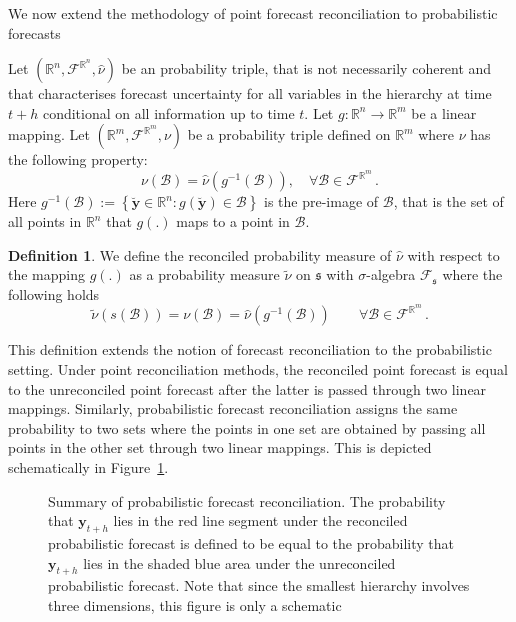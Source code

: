 \documentclass[a4paper, 11pt]{article}
\theoremstyle{theo}
\theoremstyle{definition}
\newtheorem{definition}{Definition}[section]
\begin{document}
We now extend the methodology of point forecast reconciliation to probabilistic forecasts


  Let $(\mathbb{R}^n, \mathscr{F}^{\mathbb{R}^n}, \hat{\nu})$ be an probability triple, that is not necessarily coherent and that characterises forecast uncertainty for all variables in the hierarchy at time $t+h$ conditional on all information up to time $t$.  Let $g:\mathbb{R}^n \rightarrow \mathbb{R}^m $ be a linear mapping.  Let $(\mathbb{R}^m, \mathscr{F}^{\mathbb{R}^m}, \nu)$ be a probability triple defined on $\mathbb{R}^m$ where $\nu$ has the following property:
  \begin{equation}
  \nu(\mathcal{B}) = \hat{\nu}(g^{-1}(\mathcal{B})), \quad \forall \mathcal{B} \in \mathscr{F}^{\mathbb{R}^m}\,.
  \end{equation}
  Here $g^{-1}(\mathcal{B}):=\left\{\breve{\bm{y}}\in \mathbb{R}^n:g(\breve{\bm{y}})\in \mathcal{B} \right\}$ is the pre-image of $\mathcal{B}$, that is the set of all points in $\mathbb{R}^n$ that $g(.)$ maps to a point in $\mathcal{B}$.
  \begin{definition} \label{def:reconprob}
  We define the reconciled probability measure of $\hat{\nu}$ with respect to the mapping $g(.)$ as a probability measure $\tilde{\nu}$ on $\mathfrak{s}$ with $\sigma$-algebra $\mathscr{F}_\mathfrak{s}$ where the following holds
  \begin{equation}
  \tilde{\nu}(s(\mathcal{B})) = \nu(\mathcal{B})= \hat{\nu}(g^{-1}(\mathcal{B})) \qquad \forall \mathcal{B} \in \mathscr{F}^{\mathbb{R}^m}\,.
  \end{equation}
\end{definition}

This definition extends the notion of forecast reconciliation to the probabilistic setting.   Under point reconciliation methods, the reconciled point forecast is equal to the unreconciled point forecast after the latter is passed through two linear mappings. Similarly, probabilistic forecast reconciliation assigns the same probability to two sets where the points in one set are obtained by passing all points in the other set through two linear mappings.  This is depicted schematically in Figure~\ref{fig:probfr_sch}.

\begin{figure}
	
	\caption{Summary of probabilistic forecast reconciliation.  The probability that ${\bm y}_{t+h}$ lies in the red line segment under the reconciled probabilistic forecast is defined to be equal to the probability that ${\bm y}_{t+h}$ lies in the shaded blue area under the unreconciled probabilistic forecast.  Note that since the smallest hierarchy involves three dimensions, this figure is only a schematic}\label{fig:probfr_sch} 
\end{figure}
\end{document}
